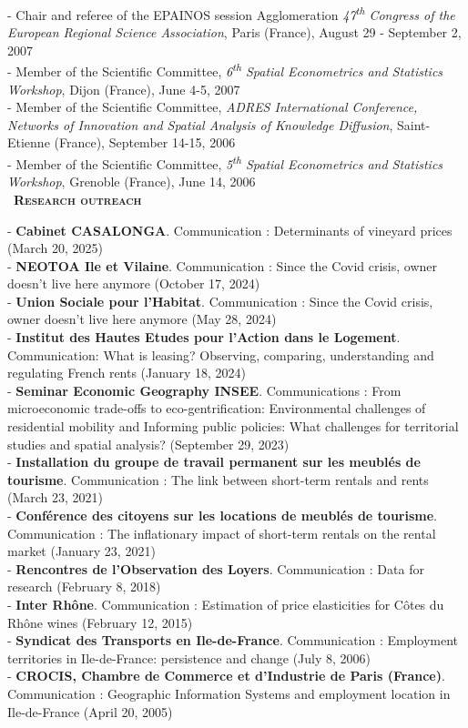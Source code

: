 \documentclass[a4paper,12pt]{article}
\newcommand{\smalltitre}[1]{%
	\noindent \textbullet~\textsc{\textbf{#1}}
	\smallskip
	}
\begin{document}
- Chair and referee of the EPAINOS session \og{}Agglomeration\fg{} \textit{47\textsuperscript{th} Congress of the European Regional Science Association}, Paris (France), August 29 - September 2, 2007 \\
- Member of the Scientific Committee, \textit{6\textsuperscript{th} Spatial Econometrics and Statistics Workshop}, Dijon (France), June 4-5, 2007 \\
- Member of the Scientific Committee, \textit{ADRES International Conference, Networks of Innovation and Spatial Analysis of Knowledge Diffusion}, Saint-Etienne (France), September 14-15, 2006 \\
- Member of the Scientific Committee, \textit{5\textsuperscript{th} Spatial Econometrics and Statistics Workshop}, Grenoble (France), June 14, 2006 \\

\smalltitre{Research outreach}\medskip

\noindent 
- \textbf{Cabinet CASALONGA}. Communication : \og{}Determinants of vineyard prices\fg{} (March 20, 2025) \\
- \textbf{NEOTOA Ile et Vilaine}. Communication : \og{}Since the Covid crisis, owner doesn't live here anymore\fg{} (October 17, 2024) \\
- \textbf{Union Sociale pour l'Habitat}. Communication : \og{}Since the Covid crisis, owner doesn't live here anymore\fg{} (May 28, 2024) \\
- \textbf{Institut des Hautes Etudes pour l'Action dans le Logement}. Communication: \og{}What is leasing? Observing, comparing, understanding and regulating French rents\fg{} (January 18, 2024) \\
- \textbf{Seminar Economic Geography INSEE}. Communications : \og{}From microeconomic trade-offs to eco-gentrification: Environmental challenges of residential mobility\fg{} and \og{}Informing public policies: What challenges for territorial studies and spatial analysis?\fg{} (September 29, 2023) \\
- \textbf{Installation du groupe de travail permanent sur les meublés de tourisme}. Communication : \og{}The link between short-term rentals and rents\fg{} (March 23, 2021) \\
- \textbf{Conférence des citoyens sur les locations de meublés de tourisme}. Communication : \og{}The inflationary impact of short-term rentals on the rental market\fg{} (January 23, 2021) \\
- \textbf{Rencontres de l'Observation des Loyers}. Communication : \og{}Data for research\fg{} (February 8, 2018) \\
- \textbf{Inter Rhône}. Communication : \og{}Estimation of price elasticities for Côtes du Rhône wines\fg{} (February 12, 2015) \\
- \textbf{Syndicat des Transports en Ile-de-France}. Communication : \og{}Employment territories in Ile-de-France: persistence and change\fg{} (July 8, 2006) \\
- \textbf{CROCIS, Chambre de Commerce et d'Industrie de Paris (France)}. Communication : \og{}Geographic Information Systems and employment location in Ile-de-France\fg{} (April 20, 2005) \\
\end{document}
